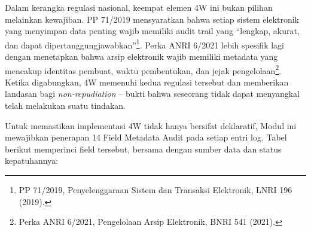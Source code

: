 \documentclass[12pt,a4paper]{report}
\begin{document}
Dalam kerangka regulasi nasional, keempat elemen 4W ini bukan pilihan melainkan kewajiban. PP 71/2019 mensyaratkan bahwa setiap sistem elektronik yang menyimpan data penting wajib memiliki audit trail yang ``lengkap, akurat, dan dapat dipertanggungjawabkan''\footnote{PP 71/2019, Penyelenggaraan Sistem dan Transaksi Elektronik, LNRI 196 (2019).}. Perka ANRI 6/2021 lebih spesifik lagi dengan menetapkan bahwa arsip elektronik wajib memiliki metadata yang mencakup identitas pembuat, waktu pembentukan, dan jejak pengelolaan\footnote{Perka ANRI 6/2021, Pengelolaan Arsip Elektronik, BNRI 541 (2021).}. Ketika digabungkan, 4W memenuhi kedua regulasi tersebut dan memberikan landasan bagi \textit{non-repudiation} -- bukti bahwa seseorang tidak dapat menyangkal telah melakukan suatu tindakan.

Untuk memastikan implementasi 4W tidak hanya bersifat deklaratif, Modul ini mewajibkan penerapan 14 Field Metadata Audit pada setiap entri log. Tabel berikut memperinci field tersebut, bersama dengan sumber data dan status kepatuhannya:
\end{document}
